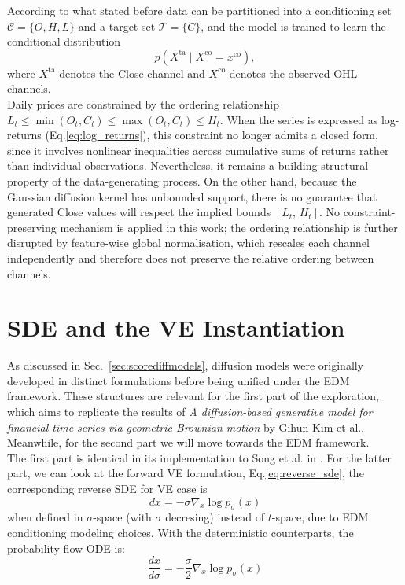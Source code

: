 According to what stated before data can be partitioned into a conditioning set 
\(\mathcal{C} = \{O, H, L\}\) and a target set \(\mathcal{T} = \{C\}\), 
and the model is trained to learn the conditional distribution
\[
    p\!\left(X^{\text{ta}} \mid X^{\text{co}} = x^{\text{co}}\right),
\]
where \(X^{\text{ta}}\) denotes the Close channel and \(X^{\text{co}}\) 
denotes the observed OHL channels.\\

Daily prices are constrained by the ordering relationship 
\(L_t \leq \min(O_t, C_t) \leq \max(O_t, C_t) \leq H_t\). 
When the series is expressed as log-returns (Eq.\ref{eq:log_returns}), this constraint no longer 
admits a closed form, since it involves nonlinear inequalities across cumulative sums of returns rather than individual observations. 
Nevertheless, it remains a building structural property of the 
data-generating process. On the other hand, because the Gaussian diffusion kernel has 
unbounded support, there is no guarantee that generated Close values 
will respect the implied bounds \([L_t,\, H_t]\). No constraint-preserving 
mechanism is applied in this work; the ordering relationship is further 
disrupted by feature-wise global normalisation, which rescales each channel independently and therefore does not preserve the relative ordering between  channels.

\section{SDE and the VE Instantiation}
As discussed in Sec.~\ref{sec:scorediffmodels}, diffusion models were 
originally developed in distinct formulations before being unified under 
the EDM framework. These structures are relevant for the first part of the 
exploration, which aims to replicate the results of \textit{A 
diffusion-based generative model for financial time series via geometric 
Brownian motion} by Gihun Kim et al.\cite{kim2025diffusion}. Meanwhile, for the second part we will move towards the EDM framework.\\

The first part is identical in its implementation to Song et al. in \cite{song2021score}. For the latter part, we can look at the forward VE formulation, Eq.\ref{eq:reverse_sde}, the corresponding reverse SDE for VE case is \[dx=-\sigma\nabla_x \log p_\sigma(x)\] when defined in \(\sigma\)-space (with \(\sigma\) decresing) instead of \(t\)-space, due to EDM conditioning modeling choices. With the deterministic counterparts, the probability flow ODE is:
\[
\frac{dx}{d\sigma}=-\frac{\sigma}{2}\nabla_x\log p_\sigma(x)
\]

